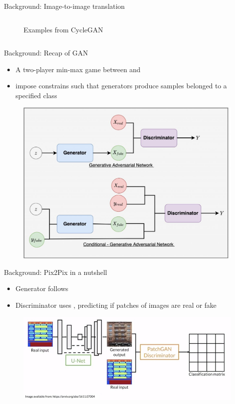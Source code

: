 \documentclass{cubeamer}
\begin{document}
\begin{frame}{Background: Image-to-image translation}
\begin{columns}
\begin{column}{0.5\textwidth}
\begin{figure}
                \caption{Examples from CycleGAN \cite{cyclegan}}
            \end{figure}
        \end{column}
    \end{columns}
\end{frame}

\begin{frame}{Background: Recap of GAN}
    \begin{itemize}
        \item A two-player min-max game between  and 
        \item {} impose constrains such that generators produce samples belonged to a specified class
    \end{itemize}
    \vspace{-0.5cm}
    \begin{figure}
        \centering
        \includegraphics[width=.45\textwidth]{figures/gan-architecture.jpeg}
    \end{figure}
\end{frame}

\begin{frame}{Background: Pix2Pix in a nutshell}
    \begin{itemize}
        \item Generator follows 
        \item Discriminator uses , predicting if patches of images are real or fake
    \end{itemize}
    \begin{figure}
        \centering
        \includegraphics[width=.8\textwidth]{figures/pix2pix-architecture.jpg}
    \end{figure}
\end{frame}
\end{document}
